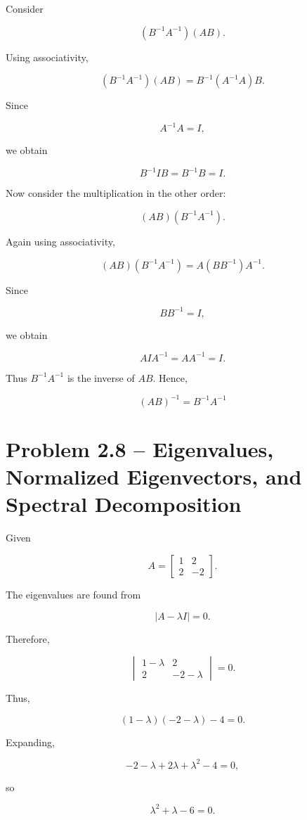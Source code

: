 \documentclass[12pt]{article}
\begin{document}
Consider

\[
(B^{-1}A^{-1})(AB).
\]

Using associativity,

\[
(B^{-1}A^{-1})(AB)
=
B^{-1}(A^{-1}A)B.
\]

Since

\[
A^{-1}A=I,
\]

we obtain

\[
B^{-1}IB
=
B^{-1}B
=
I.
\]

Now consider the multiplication in the other order:

\[
(AB)(B^{-1}A^{-1}).
\]

Again using associativity,

\[
(AB)(B^{-1}A^{-1})
=
A(BB^{-1})A^{-1}.
\]

Since

\[
BB^{-1}=I,
\]

we obtain

\[
AIA^{-1}
=
AA^{-1}
=
I.
\]

Thus $B^{-1}A^{-1}$ is the inverse of $AB$. Hence,

\[
\boxed{
(AB)^{-1}=B^{-1}A^{-1}
}
\]

\section*{Problem 2.8 -- Eigenvalues, Normalized Eigenvectors,
and Spectral Decomposition}

Given

\[
A=
\begin{bmatrix}
1 & 2\\
2 & -2
\end{bmatrix}.
\]

The eigenvalues are found from

\[
|A-\lambda I|=0.
\]

Therefore,

\[
\begin{vmatrix}
1-\lambda & 2\\
2 & -2-\lambda
\end{vmatrix}
=0.
\]

Thus,

\[
(1-\lambda)(-2-\lambda)-4=0.
\]

Expanding,

\[
-2-\lambda+2\lambda+\lambda^2-4=0,
\]

so

\[
\lambda^2+\lambda-6=0.
\]
\end{document}
